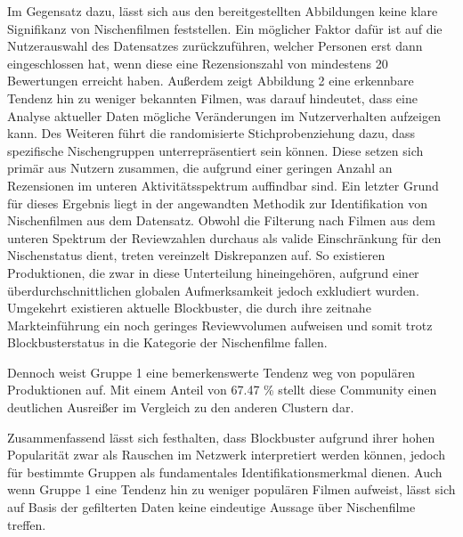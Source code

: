 Im Gegensatz dazu, lässt sich aus den bereitgestellten Abbildungen keine klare Signifikanz von Nischenfilmen feststellen.
Ein möglicher Faktor dafür ist auf die Nutzerauswahl des Datensatzes zurückzuführen, welcher Personen erst dann eingeschlossen hat, wenn diese eine Rezensionszahl von mindestens 20 Bewertungen erreicht haben.
Außerdem zeigt Abbildung 2 eine erkennbare Tendenz hin zu weniger bekannten Filmen, was darauf hindeutet, dass eine Analyse aktueller Daten mögliche Veränderungen im Nutzerverhalten aufzeigen kann.
Des Weiteren führt die randomisierte Stichprobenziehung dazu, dass spezifische Nischengruppen unterrepräsentiert sein können.
Diese setzen sich primär aus Nutzern zusammen, die aufgrund einer geringen Anzahl an Rezensionen im unteren Aktivitätsspektrum auffindbar sind.
Ein letzter Grund für dieses Ergebnis liegt in der angewandten Methodik zur Identifikation von Nischenfilmen aus dem Datensatz.
Obwohl die Filterung nach Filmen aus dem unteren Spektrum der Reviewzahlen durchaus als valide Einschränkung für den Nischenstatus dient, treten vereinzelt Diskrepanzen auf. 
So existieren Produktionen, die zwar in diese Unterteilung hineingehören, aufgrund einer überdurchschnittlichen globalen Aufmerksamkeit jedoch exkludiert wurden.
Umgekehrt existieren aktuelle Blockbuster, die durch ihre zeitnahe Markteinführung ein noch geringes Reviewvolumen aufweisen und somit trotz Blockbusterstatus in die Kategorie der Nischenfilme fallen.

Dennoch weist Gruppe 1 eine bemerkenswerte Tendenz weg von populären Produktionen auf.
Mit einem Anteil von 67.47 \% stellt diese Community einen deutlichen Ausreißer im Vergleich zu den anderen Clustern dar.

Zusammenfassend lässt sich festhalten, dass Blockbuster aufgrund ihrer hohen Popularität zwar als Rauschen im Netzwerk interpretiert werden können, jedoch für bestimmte Gruppen als fundamentales Identifikationsmerkmal dienen.
Auch wenn Gruppe 1 eine Tendenz hin zu weniger populären Filmen aufweist, lässt sich auf Basis der gefilterten Daten keine eindeutige Aussage über Nischenfilme treffen.








\clearpage

